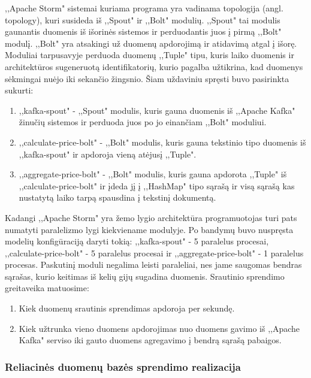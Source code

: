 \documentclass{VUMIFPSkursinis}
\begin{document}
,,Apache Storm" sistemai kuriama programa yra vadinama topologija (angl. topology), kuri susideda iš ,,Spout" ir ,,Bolt" modulių. ,,Spout" tai modulis gaunantis duomenis
iš išorinės sistemos ir perduodantis juos į pirmą ,,Bolt" modulį. ,,Bolt" yra atsakingi už duomenų apdorojimą ir atidavimą atgal į išorę.
Moduliai tarpusavyje perduoda duomenų ,,Tuple" tipu, kuris laiko duomenis ir architektūros sugeneruotą identifikatorių, 
kurio pagalba užtikrina, kad duomenys sėkmingai nuėjo iki sekančio žingsnio. 
Šiam uždaviniu spręsti buvo pasirinkta sukurti:
\begin{enumerate}
    \item ,,kafka-spout" - ,,Spout" modulis, kuris gauna duomenis iš ,,Apache Kafka" žinučių sistemos ir perduoda juos po jo einančiam ,,Bolt" moduliui.
    \item ,,calculate-price-bolt" - ,,Bolt" modulis, kuris gauna tekstinio tipo duomenis iš ,,kafka-spout" ir apdoroja vieną atėjusį ,,Tuple".
    \item ,,aggregate-price-bolt" - ,,Bolt" modulis, kuris gauna apdorota ,,Tuple" iš ,,calculate-price-bolt" ir įdeda jį į ,,HashMap" tipo sąrašą ir visą sąrašą kas nustatytą laiko tarpą spausdina į tekstinį dokumentą.  
\end{enumerate}\par
Kadangi ,,Apache Storm" yra žemo lygio architektūra programuotojas turi pats numatyti paralelizmo lygi kiekviename modulyje. 
Po bandymų buvo nuspręsta modelių konfigūraciją daryti tokią: ,,kafka-spout" - 5 paralelus procesai, ,,calculate-price-bolt"
 - 5 paralelus procesai ir ,,aggregate-price-bolt" - 1 paralelus procesas. Paskutinį moduli negalima leisti paraleliai, nes jame saugomas bendras sąrašas,
kurio keitimas iš kelių gijų sugadina duomenis. Srautinio sprendimo greitaveika matuosime:
\begin{enumerate}
    \item Kiek duomenų srautinis sprendimas apdoroja per sekundę.
    \item Kiek užtrunka vieno duomens apdorojimas nuo duomens gavimo iš ,,Apache Kafka" serviso iki gauto duomens agregavimo į bendrą sąrašą pabaigos.
\end{enumerate}

 \subsubsection{Reliacinės duomenų bazės sprendimo realizacija}
\end{document}
